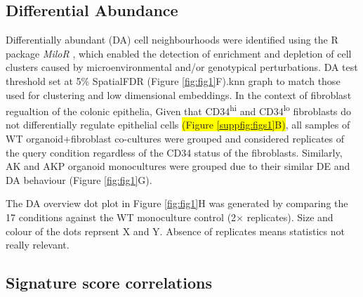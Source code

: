 \subsection*{Differential Abundance}

Differentially abundant (DA) cell neighbourhoods were identified using the R package \textit{MiloR} \cite{dann_differential_2022}, which enabled the detection of enrichment and depletion of cell clusters caused by microenvironmental and/or genotypical perturbations. 
DA test threshold set at 5\% SpatialFDR (Figure \ref{fig:fig1}F).knn graph to match those used for clustering and low dimensional embeddings.
In the context of fibroblast regualtion of the colonic epithelia, Given that CD34\textsuperscript{hi} and CD34\textsuperscript{lo} fibroblasts do not differentially regulate epithelial cells \colorbox{yellow}{(Figure \ref{suppfig:figs1}B)}, all samples of WT organoid+fibroblast co-cultures were grouped and considered replicates of the query condition regardless of the CD34 status of the fibroblasts. 
 Similarly, AK and AKP organoid monocultures were grouped due to their similar DE and DA behaviour (Figure \ref{fig:fig1}G). 
 
 The DA overview dot plot in Figure \ref{fig:fig1}H was generated by comparing the 17 conditions against the WT monoculture control (2$\times$ replicates). Size and colour of the dots reprsent X and Y. Absence of replicates means statistics not really relevant.

\subsection*{Signature score correlations}


